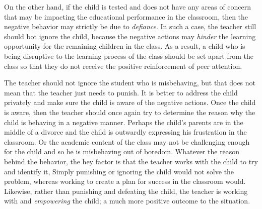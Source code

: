 On the other hand, if the child is tested and does not have any areas of concern that may be impacting the educational performance in the classroom, then the negative behavior may strictly be due to \emph{defiance}.
In such a case, the teacher still should bot ignore the child, because the negative actions may \emph{hinder} the learning opportunity for the remaining children in the class.
As a result, a child who is being disruptive to the learning process of the class should be set apart from the class so that they do not receive the positive reinforcement of peer attention.

The teacher should not ignore the student who is misbehaving, but that does not mean that the teacher just needs to punish.
It is better to address the child privately and make sure the child is aware of the negative actions.
Once the child is aware, then the teacher should once again try to determine the reason why the child is behaving in a negative manner.
Perhaps the child's parents are in the middle of a divorce and the child is outwardly expressing his frustration in the classroom.
Or the academic content of the class may not be challenging enough for the child and so he is misbehaving out of boredom.
Whatever the reason behind the behavior, the hey factor is that the teacher works with the child to try and identify it,
Simply punishing or ignoring the child would not solve the problem, whereas working to create a plan for success in the classroom would.
Likewise, rather than punishing and defeating the child, the teacher is working with and \emph{empowering} the child; a much more positive outcome to the situation.